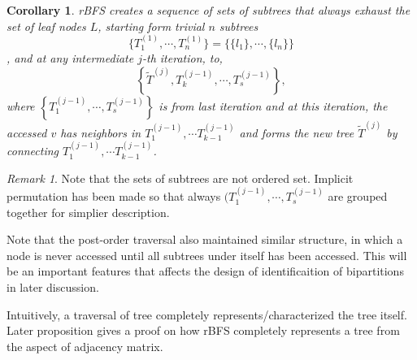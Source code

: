 \documentclass[11pt]{article}
\theoremstyle{definition}
\theoremstyle{remark}
\newtheorem{remark}[defn]{Remark}
\theoremstyle{plain}
\newtheorem{coro}[defn]{Corollary}
\begin{document}
\begin{coro}
	rBFS creates a sequence of sets of subtrees that always exhaust the set of leaf nodes $L$, starting form trivial $n$ subtrees 
	\[
		\{T_1^{(1)},\cdots, T_n^{(1)}\} = \{\{l_1\}, \cdots, \{l_n\}\}
	\]
	, and at any intermediate $j$-th iteration, to,
	\[
		\left\{\tilde{T}^{(j)}, T^{(j-1)}_k, \cdots, T^{(j-1)}_s\right\},
	\]
	where $\left\{T^{(j-1)}_1,\cdots, T^{(j-1)}_s\right\}$ is from last iteration and at this iteration, the accessed $v$ has neighbors in $T^{(j-1)}_{1},\cdots T^{(j-1)}_{k-1}$ and forms the new tree $\tilde{T}^{(j)}$ by connecting $T^{(j-1)}_{1},\cdots T^{(j-1)}_{k-1}$.
\end{coro}

\begin{remark}
	Note that the sets of subtrees are not ordered set. Implicit permutation has been made so that always $(T^{(j-1)}_1,\cdots, T^{(j-1)}_s$ are grouped together for simplier description.
\end{remark}

Note that the post-order traversal also maintained similar structure, in which a node is never accessed until all subtrees under itself has been accessed. This will be an important features that affects the design of identificaition of bipartitions in later discussion.

Intuitively, a traversal of tree completely represents/characterized the tree itself. Later proposition gives a proof on how rBFS completely represents a tree from the aspect of adjacency matrix.
\end{document}
